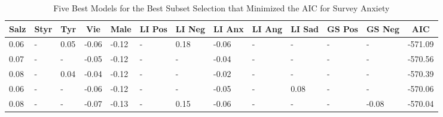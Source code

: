 \documentclass[
  english,
  jou,floatsintext]{apa7}
\begin{document}
\begin{table}[h]

\begin{center}
\begin{threeparttable}

\caption{\label{tab:subset-detail-3}Five Best Models for the Best Subset Selection that Minimized the AIC for Survey Anxiety}

\small{

\begin{tabular}{lllllllllllll}
\toprule
Salz & \multicolumn{1}{c}{Styr} & \multicolumn{1}{c}{Tyr} & \multicolumn{1}{c}{Vie} & \multicolumn{1}{c}{Male} & \multicolumn{1}{c}{LI Pos} & \multicolumn{1}{c}{LI Neg} & \multicolumn{1}{c}{LI Anx} & \multicolumn{1}{c}{LI Ang} & \multicolumn{1}{c}{LI Sad} & \multicolumn{1}{c}{GS Pos} & \multicolumn{1}{c}{GS Neg} & \multicolumn{1}{c}{AIC}\\
\midrule
0.06 & - & 0.05 & -0.06 & -0.12 & - & 0.18 & -0.06 & - & - & - & - & -571.09\\
0.07 & - & - & -0.05 & -0.12 & - & - & -0.04 & - & - & - & - & -570.56\\
0.08 & - & 0.04 & -0.04 & -0.12 & - & - & -0.02 & - & - & - & - & -570.39\\
0.06 & - & - & -0.06 & -0.12 & - & - & -0.05 & - & 0.08 & - & - & -570.06\\
0.08 & - & - & -0.07 & -0.13 & - & 0.15 & -0.06 & - & - & - & -0.08 & -570.04\\
\bottomrule
\end{tabular}

}

\end{threeparttable}
\end{center}

\end{table}
\end{document}
